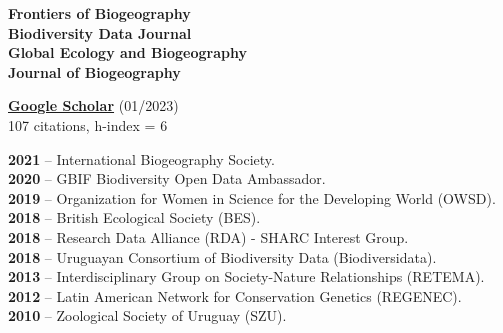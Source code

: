 \documentclass[9pt]{developercv} %
\begin{document}
\begin{minipage}[t]{0.35\textwidth}
	\vspace{-\baselineskip} %
	
	\textbf{Frontiers of Biogeography}\\
	\textbf{Biodiversity Data Journal}\\
	\textbf{Global Ecology and Biogeography}\\
	\textbf{Journal of Biogeography}


	\textbf{\href{https://scholar.google.com/citations?user=9KCM81IAAAAJ&hl}{Google Scholar}} (01/2023)\\
	107 citations, h-index = 6\\
\end{minipage} 
\hfill
\begin{minipage}[t]{0.65\textwidth}
	\vspace{-\baselineskip} %


	\textbf{2021} -- International Biogeography Society.\\
	\textbf{2020} -- GBIF Biodiversity Open Data Ambassador.\\
	\textbf{2019} -- Organization for Women in Science for the Developing World (OWSD).\\
	\textbf{2018} -- British Ecological Society (BES).\\ 
	\textbf{2018} -- Research Data Alliance (RDA) - SHARC Interest Group.\\ 
	\textbf{2018} -- Uruguayan Consortium of Biodiversity Data (Biodiversidata).\\ 
	\textbf{2013} -- Interdisciplinary Group on Society-Nature Relationships (RETEMA).\\
	\textbf{2012} -- Latin American Network for Conservation Genetics (REGENEC).\\
	\textbf{2010} -- Zoological Society of Uruguay (SZU).\\\\
	
\end{minipage} 


\end{document}
